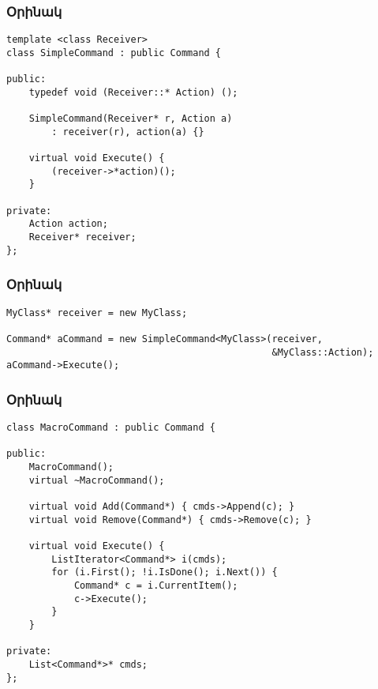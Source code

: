 \documentclass{beamer}
\begin{document}
\begin{frame}[fragile]\frametitle{Օրինակ}
\begin{english}
\begin{verbatim}
template <class Receiver>
class SimpleCommand : public Command {

public:
    typedef void (Receiver::* Action) ();

    SimpleCommand(Receiver* r, Action a)
        : receiver(r), action(a) {}

    virtual void Execute() {
        (receiver->*action)();
    }

private:
    Action action;
    Receiver* receiver;
};
\end{verbatim}
\end{english}
\end{frame}

\begin{frame}[fragile]\frametitle{Օրինակ}
\begin{english}
\begin{verbatim}
MyClass* receiver = new MyClass;

Command* aCommand = new SimpleCommand<MyClass>(receiver,
                                               &MyClass::Action);
aCommand->Execute();
\end{verbatim}
\end{english}
\end{frame}

\begin{frame}[fragile]\frametitle{Օրինակ}
\begin{english}
\begin{verbatim}
class MacroCommand : public Command {

public:
    MacroCommand();
    virtual ~MacroCommand();

    virtual void Add(Command*) { cmds->Append(c); }
    virtual void Remove(Command*) { cmds->Remove(c); }

    virtual void Execute() {
        ListIterator<Command*> i(cmds);
        for (i.First(); !i.IsDone(); i.Next()) {
            Command* c = i.CurrentItem();
            c->Execute();
        }
    }

private:
    List<Command*>* cmds;
};
\end{verbatim}
\end{english}
\end{frame}
\end{document}
